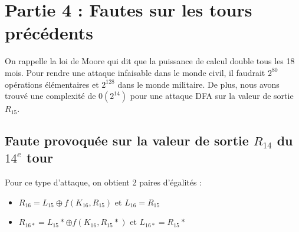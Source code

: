 \documentclass[11pt]{article}
\begin{document}
\section{Partie 4 : Fautes sur les tours précédents}

On rappelle la loi de Moore qui dit que la puissance de calcul double tous les 18 mois. Pour rendre une attaque infaisable dans le monde civil, il faudrait $2^{80}$ opérations élémentaires et $2^{128}$ dans le monde militaire. \newline
De plus, nous avons trouvé une complexité de $0(2^{14})$ pour une attaque DFA sur la valeur de sortie $R_{15}$. 

\subsection{Faute provoquée sur la valeur de sortie $R_{14}$ du $14^{e}$ tour}

Pour ce type d'attaque, on obtient 2 paires d'égalités : 

\begin{itemize}
	\item $R_{16}=L_{15} \oplus f(K_{16}, R_{15})$ et $L_{16}=R_{15}$
	\item $R_{16*}=L_{15}* \oplus f(K_{16}, R_{15}*)$ et $L_{16*}=R_{15}*$
\end{itemize}
\end{document}

